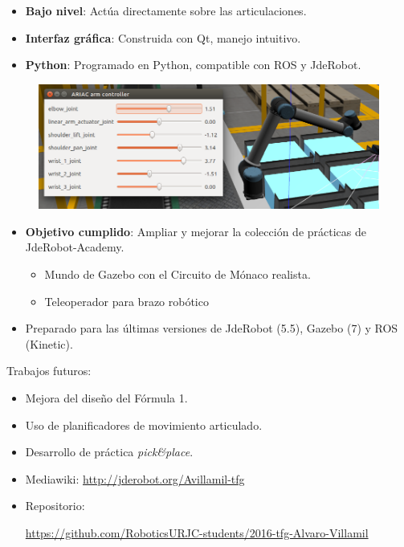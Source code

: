 \documentclass[notes,slidesec,a4]{seminar}
\begin{document}
\begin{hslide}
	\begin{itemize}
		\item \textbf{Bajo nivel}: Actúa directamente sobre las articulaciones.
		\item \textbf{Interfaz gráfica}: Construida con Qt, manejo intuitivo.
		\item \textbf{Python}: Programado en Python, compatible con ROS y JdeRobot.
	\end{itemize}
	\begin{center}
		\begin{figure}
			\includegraphics[width=\textwidth]{mando.png}
		\end{figure}
	\end{center}
\end{hslide}

\begin{hslide}
	\begin{itemize}
		\item \textbf{Objetivo cumplido}: Ampliar y mejorar la colección de prácticas de JdeRobot-Academy.
		\begin{itemize}
			\item Mundo de Gazebo con el Circuito de Mónaco realista.
			\item Teleoperador para brazo robótico
		\end{itemize}
		\item Preparado para las últimas versiones de JdeRobot (5.5), Gazebo (7) y ROS (Kinetic).
	\end{itemize}
	\vspace{0.5cm}
	Trabajos futuros:
	\begin{itemize}
		\item Mejora del diseño del Fórmula 1.
		\item Uso de planificadores de movimiento articulado.
		\item Desarrollo de práctica \textit{pick\&place}.
	\end{itemize}
\end{hslide}


\begin{hslide}
	\begin{itemize}
		\item Mediawiki: \url{http://jderobot.org/Avillamil-tfg}
		\item Repositorio:
		
		\url{https://github.com/RoboticsURJC-students/2016-tfg-Alvaro-Villamil}
	\end{itemize}
\end{hslide}
\end{document}
